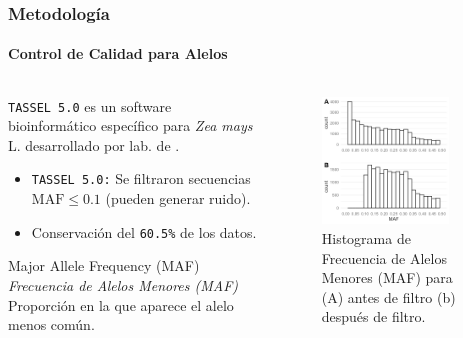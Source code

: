 \documentclass[9pt,aspectratio=169]{beamer}
\begin{document}
\begin{frame}
    \frametitle{Metodología}
    \framesubtitle{Control de Calidad para Alelos}

\begin{columns}[c]

\begin{column}{0.45\textwidth}

    {\color{darkgray}\texttt{TASSEL 5.0} es un software bioinformático específico para \textit{Zea mays} L.} desarrollado por lab. de \textcite{bradbury-2007-tassel}.
    
    \begin{itemize}
        \item \colorbox{ITESOblue!80}{\color{white}\texttt{TASSEL 5.0:}} Se filtraron secuencias $\mathrm{MAF} \leq 0.1$ (pueden generar ruido).
        \item Conservación del \texttt{\color{red}60.5\%} de los datos. 
    \end{itemize}

    \begin{block}{Major Allele Frequency (MAF)}
        \textit{Frecuencia de Alelos Menores (MAF)} Proporción en la que aparece el alelo menos común.  
    \end{block}
\end{column}

\begin{column}{0.45\textwidth}
    \begin{figure}
        \centering
        \includegraphics[width=0.85\textwidth]{SiteSumMAF.png}
        \caption{Histograma de Frecuencia de Alelos Menores (MAF) para (A) antes de filtro (b) después de filtro.}
        \label{fig:sitesummaf}
    \end{figure}
\end{column}
\end{columns}

\end{frame}
\end{document}
